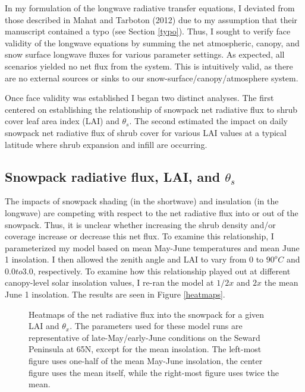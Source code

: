 \documentclass[
10pt, %
letterpaper, %
oneside, %
headinclude,footinclude, %
BCOR5mm, %
]{scrartcl}
\begin{document}
In my formulation of the longwave radiative transfer equations, I deviated from those described in Mahat and Tarboton (2012) due to my assumption that their manuscript contained a typo (see Section \ref{typo}). Thus, I sought to verify face validity of the longwave equations by summing the net atmospheric, canopy, and snow surface longwave fluxes for various parameter settings. As expected, all scenarios yielded no net flux from the system. This is intuitively valid, as there are no external sources or sinks to our snow-surface/canopy/atmosphere system.

Once face validity was established I began two distinct analyses. The first centered on establishing the relationship of snowpack net radiative flux to shrub cover leaf area index (LAI) and $\theta_s$. The second estimated the impact on daily snowpack net radiative flux of shrub cover for various LAI values at a typical latitude where shrub expansion and infill are occurring.

\subsection{Snowpack radiative flux, LAI, and $\theta_s$}
The impacts of snowpack shading (in the shortwave) and insulation (in the longwave) are competing with respect to the net radiative flux into or out of the snowpack. Thus, it is unclear whether increasing the shrub density and/or coverage increase or decrease this net flux. To examine this relationship, I parameterized my model based on mean May-June temperatures and mean June 1 insolation. I then allowed the zenith angle and LAI to vary from $0$ to $90^oC$ and $0.0 to 3.0$, respectively. To examine how this relationship played out at different canopy-level solar insolation values, I re-ran the model at $1/2x$ and $2x$ the mean June 1 insolation. The results are seen in Figure \ref{heatmaps}.

\begin{figure}
\centering 
{}
\caption{Heatmaps of the net radiative flux into the snowpack for a given LAI and $\theta_x$. The parameters used for these model runs are representative of late-May/early-June conditions on the Seward Peninsula at 65N, except for the mean insolation. The left-most figure uses one-half of the mean May-June insolation, the center figure uses the mean itself, while the right-most figure uses twice the mean.}
\label{fig:heatmaps} 
\end{figure}
\end{document}
